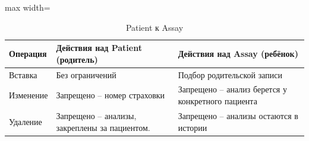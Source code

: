 \documentclass[a4paper, 14pt]{extarticle}
\begin{document}
\begin{table}[h!]
\centering
\captionsetup{singlelinecheck=false, position=top}
\caption{Patient к Assay}
\begin{adjustbox}{max width=\textwidth}
\begin{tabular}{|p{}|p{}|p{}|}
\hline
	\textbf{Операция} & \textbf{Действия над Patient (родитель)} & \textbf{Действия над Assay (ребёнок)} \\
\hline
Вставка & Без ограничений & Подбор родительской записи \\
\hline
Изменение & Запрещено -- номер страховки & Запрещено -- анализ берется у конкретного пациента \\
\hline
Удаление & Запрещено -- анализы, закреплены за пациентом. & Запрещено -- анализы остаются в истории \\
\hline
\end{tabular}
\end{adjustbox}
\label{table:PatientAssay}
\end{table}
\end{document}
